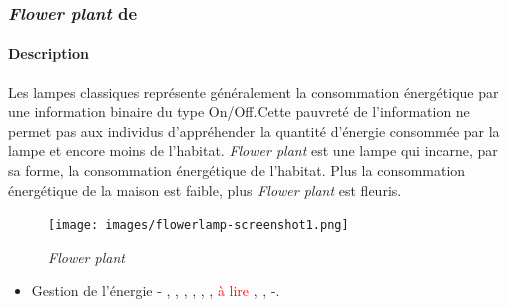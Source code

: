 \documentclass[10pt,a5paper,twoside]{article}
\begin{document}
\subsubsection{\emph{Flower plant} de
\citet{lagerkvist2016flower}}\label{flower-plant-de-lagerkvist2016flower}

\paragraph{Description}\label{description-7}

Les lampes classiques représente généralement la consommation
énergétique par une information binaire du type On/Off.Cette pauvreté de
l'information ne permet pas aux individus d'appréhender la quantité
d'énergie consommée par la lampe et encore moins de l'habitat.
\emph{Flower plant} est une lampe qui incarne, par sa forme, la
consommation énergétique de l'habitat. Plus la consommation énergétique
de la maison est faible, plus \emph{Flower plant} est fleuris.

\begin{figure}
\centering
\texttt{[image: images/flowerlamp-screenshot1.png]}
\caption{\emph{Flower plant}}\label{fig:flowerlamp1}
\end{figure}

\begin{itemize}
\itemsep1pt\parskip0pt
\item
  Gestion de l'énergie - \citet{kyoto2005wattson},
  \citet{jonsson2010watt}, \citet{ernevi2005energy},
  \citet{gyllensward2006visualizing}, \citet{lagerkvist2016flower},
  \citet{lagerkvist2016disappearing}, \textcolor{red}{à lire}
  \citet{rogers2010ambient}, \citet{kuznetsov2010upstream},
  \citet{valkanova2013reveal} -.
\end{itemize}

\newpage


\end{document}
